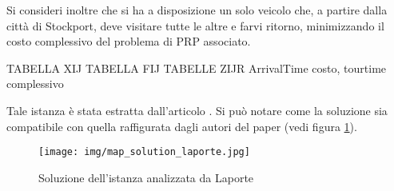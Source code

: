 		Si consideri inoltre che si ha a disposizione un solo veicolo che, a partire dalla città di  Stockport, deve visitare tutte le altre e farvi ritorno, minimizzando il costo complessivo del problema di PRP associato.

		TABELLA XIJ
		TABELLA FIJ
		TABELLE ZIJR
		ArrivalTime
		costo, tourtime complessivo

		Tale istanza è stata estratta dall’articolo \cite{Laporte11}. Si può notare come la soluzione sia compatibile con quella raffigurata dagli autori del paper (vedi figura \ref{fig:map_laporte}). 

		\begin{figure}[H]
			\centering
			\texttt{[image: img/map\_solution\_laporte.jpg]}
			\caption{Soluzione dell'istanza analizzata da Laporte \cite{Laporte11}}
			\label{fig:map_laporte}
		\end{figure}
		
		
